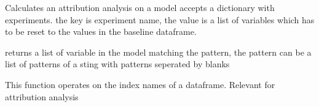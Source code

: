 \documentclass[letterpaper,10pt,english]{sphinxmanual}
\begin{document}

\begin{fulllineitems}
\label{\detokenize{attribution/modeldekom:modeldekom.attribution_new}}
\pysigstartsignatures
{}
\pysigstopsignatures
\sphinxAtStartPar
Calculates an attribution analysis on a model
accepts a dictionary with experiments. the key is experiment name, the value is a list
of variables which has to be reset to the values in the baseline dataframe.

\end{fulllineitems}


\begin{fulllineitems}
\label{\detokenize{attribution/modeldekom:modeldekom.ilist}}
\pysigstartsignatures
{}
\pysigstopsignatures
\sphinxAtStartPar
returns a list of variable in the model matching the pattern,
the pattern can be a list of patterns of a sting with patterns seperated by
blanks

\sphinxAtStartPar
This function operates on the index names of a dataframe. Relevant for attribution analysis

\end{fulllineitems}

\end{document}
